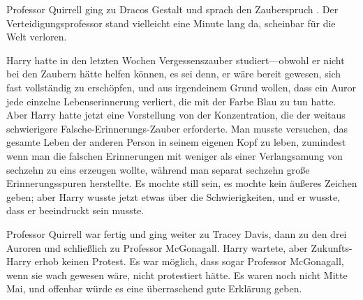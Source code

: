 Professor Quirrell ging zu Dracos Gestalt und sprach den Zauberspruch . Der Verteidigungsprofessor stand vielleicht eine Minute lang da, scheinbar für die Welt verloren.

Harry hatte in den letzten Wochen Vergessenszauber studiert—obwohl er nicht bei den Zaubern hätte helfen können, es sei denn, er wäre bereit gewesen, sich fast vollständig zu erschöpfen, und aus irgendeinem Grund wollen, dass ein Auror jede einzelne Lebenserinnerung verliert, die mit der Farbe Blau zu tun hatte. Aber Harry hatte jetzt eine Vorstellung von der Konzentration, die der weitaus schwierigere Falsche-Erinnerungs-Zauber erforderte. Man musste versuchen, das gesamte Leben der anderen Person in seinem eigenen Kopf zu leben, zumindest wenn man die falschen Erinnerungen mit weniger als einer Verlangsamung von sechzehn zu eins erzeugen wollte, während man separat sechzehn große Erinnerungsspuren herstellte. Es mochte still sein, es mochte kein äußeres Zeichen geben; aber Harry wusste jetzt etwas über die Schwierigkeiten, und er wusste, dass er beeindruckt sein musste.

Professor Quirrell war fertig und ging weiter zu Tracey Davis, dann zu den drei Auroren und schließlich zu Professor McGonagall. Harry wartete, aber Zukunfts-Harry erhob keinen Protest. Es war möglich, dass sogar Professor McGonagall, wenn sie wach gewesen wäre, nicht protestiert hätte. Es waren noch nicht Mitte Mai, und offenbar würde es eine überraschend gute Erklärung geben.

